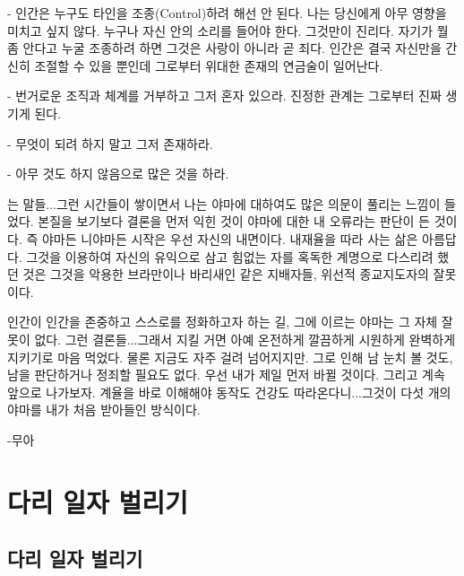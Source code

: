 \documentclass[12pt, a4paper, oneside]{book}
\let\stdsection\section
\renewcommand\section{\newpage\stdsection}
\begin{document}
- 인간은 누구도 타인을 조종(Control)하려 해선 안 된다. 나는 당신에게 아무 영향을 미치고 싶지 않다. 누구나 자신 안의 소리를 들어야 한다. 그것만이 진리다. 자기가 뭘 좀 안다고 누굴 조종하려 하면 그것은 사랑이 아니라 곧 죄다. 인간은 결국 자신만을 간신히 조절할 수 있을 뿐인데 그로부터 위대한 존재의 연금술이 일어난다.

- 번거로운 조직과 체계를 거부하고 그저 혼자 있으라. 진정한 관계는 그로부터 진짜 생기게 된다.

- 무엇이 되려 하지 말고 그저 존재하라. 

- 아무 것도 하지 않음으로 많은 것을 하라.




는 말들...그런 시간들이 쌓이면서 나는 야마에 대하여도 많은 의문이 풀리는 느낌이 들었다. 본질을 보기보다 결론을 먼저 익힌 것이 야마에 대한 내 오류라는 판단이 든 것이다. 즉 야마든 니야마든 시작은 우선 자신의 내면이다. 내재율을 따라 사는 삶은 아름답다. 그것을 이용하여 자신의 유익으로 삼고 힘없는 자를 혹독한 계명으로 다스리려 했던 것은 그것을 악용한 브라만이나 바리새인 같은 지배자들, 위선적 종교지도자의 잘못이다.

인간이 인간을 존중하고 스스로를 정화하고자 하는 길, 그에 이르는 야마는 그 자체 잘못이 없다. 그런 결론들...그래서 지킬 거면 아예 온전하게 깔끔하게 시원하게 완벽하게 지키기로 마음 먹었다. 물론 지금도 자주 걸려 넘어지지만. 그로 인해 남 눈치 볼 것도, 남을 판단하거나 정죄할 필요도 없다. 우선 내가 제일 먼저 바뀔 것이다. 그리고 계속 앞으로 나가보자. 계율을 바로 이해해야 동작도 건강도 따라온다니...그것이 다섯 개의 야마를 내가 처음 받아들인 방식이다.     



                                                                                                                   -무아 





	\chapter{다리 일자 벌리기}
	\newpage
	\minitoc

	\section{다리 일자 벌리기} 
\end{document}

